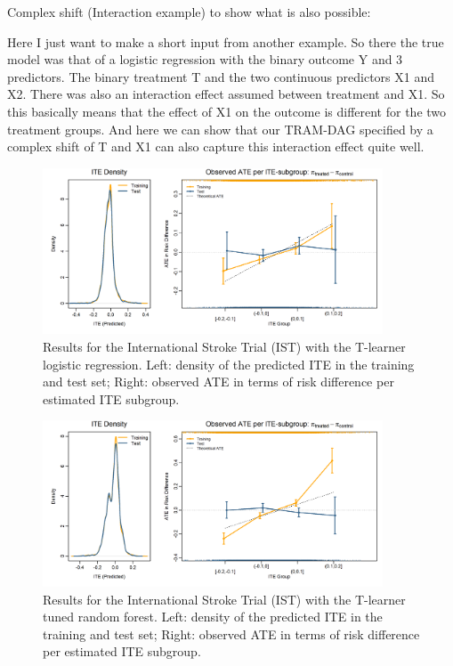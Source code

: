 Complex shift (Interaction example) to show what is also possible:

Here I just want to make a short input from another example. So there the true model was that of a logistic regression with the binary outcome Y and 3 predictors. The binary treatment T and the two continuous predictors X1 and X2. There was also an interaction effect assumed between treatment and X1. So this basically means that the effect of X1 on the outcome is different for the two treatment groups.
And here we can show that our TRAM-DAG specified by a complex shift of T and X1 can also capture this interaction effect quite well.

\clearpage




\begin{figure}[htbp]
\centering
\includegraphics[width=0.9\textwidth]{img/results_IST/glm_tlearner_density_ITE_ATE.png}
\caption{Results for the International Stroke Trial (IST) with the T-learner logistic regression. Left: density of the predicted ITE in the training and test set; Right: observed ATE in terms of risk difference per estimated ITE subgroup.}
\label{fig:IST_density_ITE_ATE_glm_tlearner}
\end{figure}



\begin{figure}[htbp]
\centering
\includegraphics[width=0.9\textwidth]{img/results_IST/IST_tuned_rf_tlearner_density_ITE_ATE.png}
\caption{Results for the International Stroke Trial (IST) with the T-learner tuned random forest. Left: density of the predicted ITE in the training and test set; Right: observed ATE in terms of risk difference per estimated ITE subgroup.}
\label{fig:IST_density_ITE_ATE_tuned_rf}
\end{figure}


